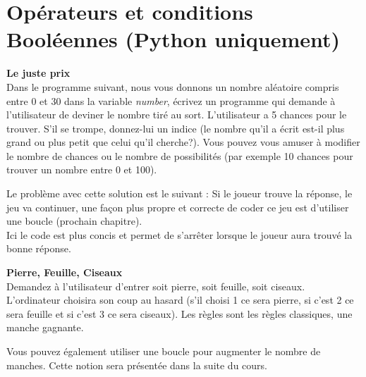 \section{Opérateurs et conditions Booléennes (Python uniquement)}

\begin{Exercice}[20 minutes] \textbf{Le juste prix }\\
  Dans le programme suivant, nous vous donnons un nombre aléatoire compris entre 0 et 30 dans la variable \textit{number}, écrivez un programme qui demande à l'utilisateur de deviner le nombre tiré au sort. L'utilisateur a 5 chances pour le trouver. S'il se trompe, donnez-lui un indice (le nombre qu'il a écrit est-il plus grand ou plus petit que celui qu'il cherche?). Vous pouvez vous amuser à modifier le nombre de chances ou le nombre de possibilités (par exemple 10 chances pour trouver un nombre entre 0 et 100).   \\
  
  
  
  \begin{solution}
   
   
   Le problème avec cette solution est le suivant : Si le joueur trouve la réponse, le jeu va continuer, une façon plus propre et correcte de coder ce jeu est d'utiliser une boucle (prochain chapitre). \\
   
   
   
  	Ici le code est plus concis et permet de s'arrêter lorsque le joueur aura trouvé la bonne réponse.\\
           
    \end{solution}   
\end{Exercice}

\begin{Exercice}[20 minutes] \textbf{Pierre, Feuille, Ciseaux }\\
  Demandez à l'utilisateur d'entrer soit pierre, soit feuille, soit ciseaux. L'ordinateur choisira son coup au hasard (s'il choisi 1 ce sera pierre, si c'est 2 ce sera feuille et si c'est 3 ce sera ciseaux). Les règles sont les règles classiques, une manche gagnante.   \\
  
  
   
    \begin{solution}
    
    
    
    Vous pouvez également utiliser une boucle pour augmenter le nombre de manches. Cette notion sera présentée dans la suite du cours.\\
           
    \end{solution}   
\end{Exercice}



